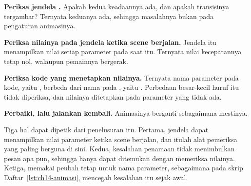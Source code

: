 \begin{langkah}
  \item \textbf{Periksa jendela .} Apakah kedua keadaannya
        ada, dan apakah transisinya tergambar? Ternyata keduanya ada, sehingga
        masalahnya bukan pada pengaturan animasinya.
  \item \textbf{Periksa nilainya pada jendela  ketika scene
        berjalan.} Jendela itu menampilkan nilai setiap parameter pada saat
        itu. Ternyata nilai kecepatannya tetap nol, walaupun pemainnya
        bergerak.
  \item \textbf{Periksa kode yang menetapkan nilainya.} Ternyata nama parameter
        pada kode, yaitu , berbeda dari nama pada
        , yaitu . Perbedaan besar-kecil huruf
        itu tidak diperiksa, dan nilainya ditetapkan pada parameter yang tidak
        ada.
  \item \textbf{Perbaiki, lalu jalankan kembali.} Animasinya berganti
        sebagaimana mestinya.
\end{langkah}

Tiga hal dapat dipetik dari penelusuran itu. Pertama, jendela
 dapat menampilkan nilai parameter ketika scene berjalan,
dan itulah alat pemeriksa yang paling berguna di sini. Kedua, kesalahan
penamaan tidak menimbulkan pesan apa pun, sehingga hanya dapat ditemukan
dengan memeriksa nilainya. Ketiga, memakai peubah tetap untuk nama parameter,
sebagaimana pada skrip Daftar~\ref{lst:ch14-animasi}, mencegah kesalahan itu
sejak awal.
